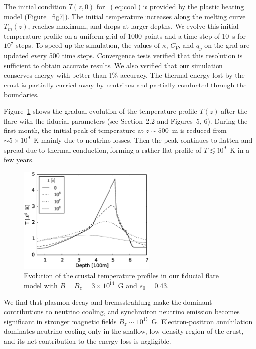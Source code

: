 The initial condition $T(z,0)$ for \Eq~(\ref{eq:cool}) is provided by the plastic heating model (Figure~\ref{fig7}). 
The initial temperature increases along the melting curve $T_m(z)$, reaches maximum, and drops at larger depths. 
We evolve this initial temperature profile on a uniform grid of 1000 points and a time step of 10~s for $10^7$ steps. 
To speed up the simulation, the values of $\kappa$, $C_V$, and $\dot{q}_\nu$ on the grid are updated every 500 time steps.
Convergence tests verified that this resolution is sufficient to obtain accurate results.
We also verified that our simulation conserves energy with better than 1\% accuracy.
The thermal energy lost by the crust is partially carried away by neutrinos and partially conducted through the boundaries.  

Figure~\ref{fig8} shows the gradual evolution of the temperature profile $T(z)$ after the flare with the fiducial parameters (see Section~2.2 and Figures~5, 6). 
During the first month, the initial peak of temperature at $z\sim 500$~m is reduced from $\sim 5\times 10^9$~K mainly due to neutrino losses. 
Then the peak continues to flatten and spread due to thermal conduction, forming a rather flat profile of $T\lesssim 10^9$~K in a few years.

\begin{figure}[htbp]
\centering
\includegraphics[width=0.6\textwidth]{pics/chap3/fig8.eps} 
\caption[Evolution of the crustal temperature profiles]{Evolution of the crustal temperature profiles in our fiducial flare model with $B=B_z=3\times 10^{14}$~G and $s_0=0.43$.}
\label{fig8}
\end{figure}

We find that plasmon decay and bremsstrahlung make the dominant contributions to neutrino cooling, and synchrotron neutrino emission becomes significant in stronger magnetic fields $B_z\sim 10^{15}$~G. 
Electron-positron annihilation dominates neutrino cooling only in the shallow, low-density region of the crust, and its net contribution to the energy loss is negligible.


